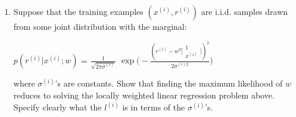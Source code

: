 \documentclass[12pt]{article}
\begin{document}
\begin {enumerate}
\begin {enumerate}
					\noindent\makebox[\linewidth]{\rule{\textwidth}{0.4pt}}
					\begin {flushleft} %
						Find $w_{exm}$ such that $\bigtriangledown\bigg[\frac{1}{2}\displaystyle\sum_{t=1}^N l^{(i)}$
						$(w^T \bigg[ \begin{array}{c}1 \\ x^{(i)}\end{array} \bigg] - r^{(i)})^2\bigg]
						\Bigg|_{w=w_{exm}}$ = 0.
						
						\begin{align*}
							(Xw-r)^TL(Xw-r) & = (w^TX^T - r^T)L(Xw-r) \\
							& = w^TX^TLXw - w^TX^TLr - r^TLXw + r^TLr \\
							\bigtriangledown \bigg[ (Xw-r)^TL(Xw-r) \bigg]
							& = \bigtriangledown (w^TX^TLXw - w^TX^TLr - r^TLXw + r^TLr) \\
							& = 2X^TL^TXw - X^TLr - X^TL^Tr \\
							& = 2 (X^TLXw - X^TLr) \\
							2 (X^TLXw_{exm} - X^TLr) = 0 
							& \implies w_{exm} = (X^TLX)^{-1}(X^TL)r
						\end{align*}
					
					\end {flushleft}
					\noindent\makebox[\linewidth]{\rule{\textwidth}{0.4pt}}
					
				\item Suppose that the training examples $(x^{(i)}, r^{(i)})$ are i.i.d. 
					samples drawn from some joint distribution with the marginal: \\
					\begin {center}
						$p(r^{(i)} | x^{(i)} ; w)$ = $\frac{1}{\sqrt{2\pi\sigma^{(i)}}}$ $\exp{\Bigg(
							- \frac{(r^{(i)} - w^T\bigg[ \begin{array}{c} 1 \\ x^{(i)} \end{array} \bigg])^2}{2\sigma^{(i)2}}
						\Bigg)}$
					\end {center}
					where $\sigma^{(i)}$'s are constants. Show that finding the maximum likelihood of $w$ reduces to 
					solving the locally weighted linear regression problem above. Specify clearly what the $l^{(i)}$ is 
					in terms of the $\sigma^{(i)}$'s.
					
					\noindent\makebox[\linewidth]{\rule{\textwidth}{0.4pt}}
					\begin {flushleft} %
						

\end{flushleft}
\end{enumerate}
\end{enumerate}
\end{document}
